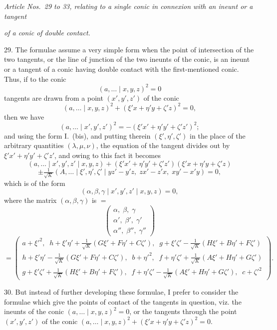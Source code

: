 \documentclass[11pt]{article}
\begin{document}
\medskip
\centerline{\textit{Article Nos.~29 to 33, relating to a single conic in connexion with an ineunt or a tangent}}
\centerline{\textit{of a conic of double contact.}}
\medskip

\textsc{29.} The formulae assume a very simple form when the point of intersection of
the two tangents, or the line of junction of the two ineunts of the conic, is an
ineunt or a tangent of a conic having double contact with the first-mentioned conic.
Thus, if to the conic
\[ (a,\dots \mid x,y,z)^{2}=0 \]
tangents are drawn from a point $(x',y',z')$ of the conic
\[ (a,\dots \mid x,y,z)^{2}+(\xi' x+\eta' y+\zeta' z)^{2}=0, \]
then we have
\[ (a,\dots \mid x',y',z')^{2}=-(\xi' x'+\eta' y'+\zeta' z')^{2}; \]
and using the form \textsc{I.}~(bis), and putting therein $(\xi',\eta',\zeta')$ in the place of the
arbitrary quantities $(\lambda,\mu,\nu)$, the equation of the tangent divides out by $\xi' x'+\eta' y'+\zeta' z'$,
and owing to this fact it becomes
\[ (a,\dots \mid x',y',z' \mid x,y,z)+(\xi' x'+\eta' y'+\zeta' z')(\xi' x+\eta' y+\zeta' z) \]
\[ \pm\tfrac{1}{\sqrt{K}}(A,\dots \mid \xi',\eta',\zeta' \mid yz'-y'z,\;zx'-z'x,\;xy'-x'y)=0, \]
which is of the form
\[ (\alpha,\beta,\gamma \mid x',y',z' \mid x,y,z)=0, \]
where the matrix $(\alpha,\beta,\gamma)$ is $=$
\[ \begin{pmatrix}
\alpha,\;\beta,\;\gamma\\
\alpha',\;\beta',\;\gamma'\\
\alpha'',\;\beta'',\;\gamma''
\end{pmatrix} \]
\[ =\begin{pmatrix}
a+\xi'^{2},\;\;h+\xi'\eta'+\tfrac{1}{\sqrt{K}}(G\xi'+F\eta'+C\zeta'),\;\;g+\xi'\zeta'-\tfrac{1}{\sqrt{K}}(H\xi'+B\eta'+F\zeta')\\[0.3em]
h+\xi'\eta'-\tfrac{1}{\sqrt{K}}(G\xi'+F\eta'+C\zeta'),\;\;b+\eta'^{2},\;\;f+\eta'\zeta'+\tfrac{1}{\sqrt{K}}(A\xi'+H\eta'+G\zeta')\\[0.3em]
g+\xi'\zeta'+\tfrac{1}{\sqrt{K}}(H\xi'+B\eta'+F\zeta'),\;\;f+\eta'\zeta'-\tfrac{1}{\sqrt{K}}(A\xi'+H\eta'+G\zeta'),\;\;c+\zeta'^{2}
\end{pmatrix}. \]

\textsc{30.} But instead of further developing these formulae, I prefer to consider the
formulae which give the points of contact of the tangents in question, viz. the ineunts
of the conic $(a,\dots \mid x,y,z)^{2}=0$, or the tangents through the point $(x',y',z')$ of the
conic $(a,\dots \mid x,y,z)^{2}+(\xi' x+\eta' y+\zeta' z)^{2}=0$.
\end{document}
